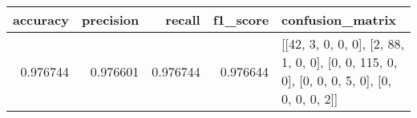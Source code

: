 \begin{tabular}{rrrrl}
\toprule
accuracy & precision & recall & f1_score & confusion_matrix \\
\midrule
0.976744 & 0.976601 & 0.976744 & 0.976644 & [[42, 3, 0, 0, 0], [2, 88, 1, 0, 0], [0, 0, 115, 0, 0], [0, 0, 0, 5, 0], [0, 0, 0, 0, 2]] \\
\bottomrule
\end{tabular}

